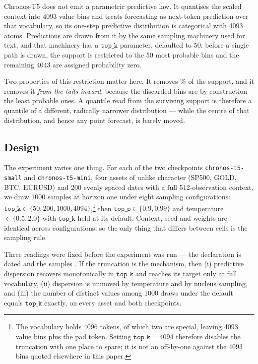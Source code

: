 \documentclass[preprint,11pt,authoryear]{elsarticle}
\newcommand{\1}{\boldsymbol{1}}
\begin{document}
Chronos-T5 does not emit a parametric predictive law. It quantises the scaled
context into 4093 value bins and treats forecasting as next-token prediction over
that vocabulary, so its one-step predictive distribution is categorical with 4093
atoms. Predictions are drawn from it by the same sampling machinery used for
text, and that machinery has a $\texttt{top\_k}$ parameter, defaulted to 50:
before a single path is drawn, the support is restricted to the 50 most probable
bins and the remaining 4043 are assigned probability zero.

Two properties of this restriction matter here. It removes \nLitSupportPct\% of the support,
and it removes it \emph{from the tails inward}, because the discarded bins are by
construction the least probable ones. A quantile read from the surviving support
is therefore a quantile of a different, radically narrower distribution --- while
the centre of that distribution, and hence any point forecast, is barely moved.

\subsection{Design}
\label{app:mech_design}

The experiment varies one thing. For each of the two checkpoints
\texttt{chronos-t5-small} and \texttt{chronos-t5-mini}, four assets of unlike
character (SP500, GOLD, BTC, EURUSD) and 200 evenly spaced dates with a full
512-observation context, we draw 1000 samples at horizon one under eight
sampling configurations: $\texttt{top\_k} \in \{50, 200, 1000, 4094\}$,\footnote{The
vocabulary holds 4096 tokens, of which two are special, leaving 4093 value bins
plus the pad token. Setting $\texttt{top\_k} = 4094$ therefore disables the
truncation with one place to spare; it is not an off-by-one against the 4093 bins
quoted elsewhere in this paper.} then
$\texttt{top\_p} \in \{0.9, 0.99\}$ and temperature $\in \{0.5, 2.0\}$ with
$\texttt{top\_k}$ held at its default. Context, seed and weights are identical
across configurations, so the only thing that differs between cells is the
sampling rule.

Three readings were fixed before the experiment was run --- the declaration is
dated \nChronosDeclared{} and the samples \nChronosRun. If the truncation is the
mechanism, then (i) predictive dispersion recovers monotonically in
$\texttt{top\_k}$ and reaches its target only at full vocabulary, (ii) dispersion
is unmoved by temperature and by nucleus sampling, and (iii) the number of
distinct values among 1000 draws under the default equals $\texttt{top\_k}$
exactly, on every asset and both checkpoints.
\end{document}
